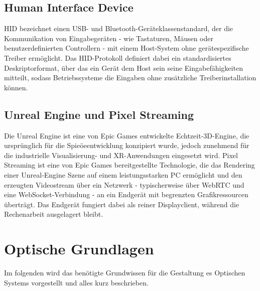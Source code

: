 \subsection{Human Interface Device}
\label{subsec:HID}
\ac{HID} bezeichnet einen \ac{USB}- und Bluetooth-Geräteklassenstandard, der die Kommunikation von Eingabegeräten - wie Tastaturen, Mäusen oder benutzerdefinierten Controllern - mit einem Host-System ohne gerätespezifische Treiber ermöglicht. Das \ac{HID}-Protokoll definiert dabei ein standardisiertes Deskriptorformat, über das ein Gerät dem Host sein seine Eingabefähigkeiten mitteilt, sodass Betriebssysteme die Eingaben ohne zusätzliche Treiberinstallation können.\autocite[vgl.]{HumanInterfaceDevices}

\subsection{Unreal Engine und Pixel Streaming}
\label{subsec:UnrealUndPixelStreaming}
Die Unreal Engine ist eine von Epic Games entwickelte Echtzeit-3D-Engine, die ursprünglich für die Spieöeentwicklung konzipiert wurde, jedoch zunehmend für die industrielle Visualisierung- und XR-Anwendungen eingesetzt wird. Pixel Streaming ist eine von Epic Games bereitgestellte Technologie, die das Rendering einer Unreal-Engine Szene auf einem leistungsstarken PC ermöglicht und den erzeugten Videostream über ein Netzwerk - typischerweise über \ac{WebRTC} und eine WebSocket-Verbindung - an ein Endgerät mit begrenzten Grafikressourcen überträgt. Das Endgerät fungiert dabei als reiner Displayclient, während die Rechenarbeit ausgelagert bleibt.\autocite{PixelStreamingUnreal}

\newpage

\section{Optische Grundlagen}
\label{sec:optischeGrundlagen}
Im folgenden wird das benötigte Grundwissen für die Gestaltung es Optischen Systems vorgestellt und alles kurz beschrieben.


